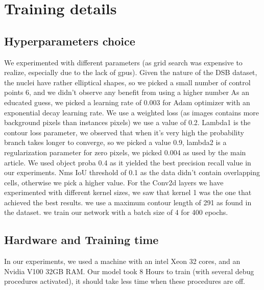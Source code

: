 \documentclass[main.tex]{subfiles}
\begin{document}
\section{Training details}


\subsection{Hyperparameters choice}
We experimented with different parameters (as grid search was expensive to realize, especially due to the lack of gpus). Given the nature of the DSB dataset, the nuclei have rather elliptical shapes, so we picked a small number of control points 6, and we didn't observe any benefit from using a higher number As an educated guess, we picked a learning rate of 0.003 for Adam optimizer with an exponential decay learning rate. We use a weighted loss (as images contains more background pixels than instances pixels) we use a value of 0.2. Lambda1 is the contour loss parameter, we observed that when it's very high the probability branch takes longer to converge, so we picked a value 0.9, lambda2 is a regularization parameter for zero pixels, we picked 0.004 as used by the main article. We used object proba 0.4 as it yielded the best precision recall value in our experiments. Nms IoU threshold of 0.1 as the data didn't contain overlapping cells, otherwise we pick a higher value. For the Conv2d layers we have experimented with different kernel sizes, we saw that kernel 1 was the one that achieved the best results. we use a maximum contour length of 291 as found in the dataset. we train our network with a batch size of 4 for 400 epochs.


\subsection{Hardware and Training time}
In our experiments, we used a machine with an intel Xeon 32 cores, and an Nvidia V100 32GB RAM. Our model took 8 Hours to train (with several debug procedures activated), it should take less time when these procedures are off.
\end{document}

